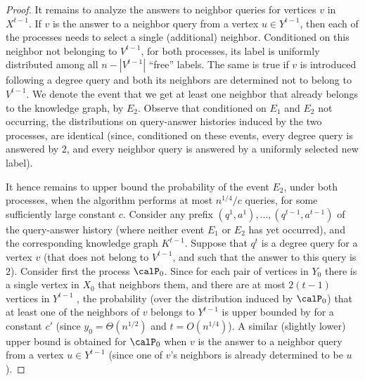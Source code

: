 \begin{proof}
It remains to analyze the answers to neighbor queries for vertices $v$ in $X^{t-1}$.
If $v$ is the answer to a neighbor query from a vertex $u \in Y^{t-1}$, then each of the processes needs to select a single (additional) neighbor. Conditioned on this neighbor not belonging to $V^{t-1}$, for both processes, its label is uniformly distributed among all $n-|V^{t-1}|$ ``free'' labels. The same is true if $v$ is introduced following a degree query and both its neighbors are determined not to belong to $V^{t-1}$. We denote the event that we get at least one neighbor that already belongs to the knowledge graph, by $E_2$. Observe that conditioned on $E_1$ and $E_2$ not occurring,  the distributions on query-answer histories induced by the two processes, are identical (since, conditioned on these events, every degree query is answered by $2$, and every neighbor query is answered by a uniformly selected new label).

It hence remains to upper bound the probability of the event $E_2$, under both processes, when the algorithm performs at most $n^{1/4}/c$ queries, for some sufficiently large constant $c$. Consider any prefix $(q^1,a^1),\dots,(q^{t-1},a^{t-1})$ of the query-answer history (where neither event $E_1$ or $E_2$ has yet occurred), and the corresponding knowledge graph $K^{t-1}$.
Suppose that $q^t$ is a degree query for a vertex $v$ (that does not belong to $V^{t-1}$, and such that the answer to this query is $2$). Consider first the process $\calP_0$. 
 Since for each pair of vertices in $Y_0$ there is a single vertex in $X_0$ that neighbors them, and there are at most $2(t-1)$ vertices in $Y^{t-1}$ , the probability (over the distribution induced by $\calP_0$) that at least one of the neighbors of $v$ belongs to $Y^{t-1}$ is upper bounded by
 for a constant $c'$ (since $y_0 = \Theta(n^{1/2})$ and $t = O(n^{1/4})$). A similar (slightly lower) upper bound is obtained for $\calP_0$ when $v$ is the answer to a neighbor query from a vertex $u \in Y^{t-1}$ (since one of $v$'s neighbors is already determined to be $u$).


\end{proof}
